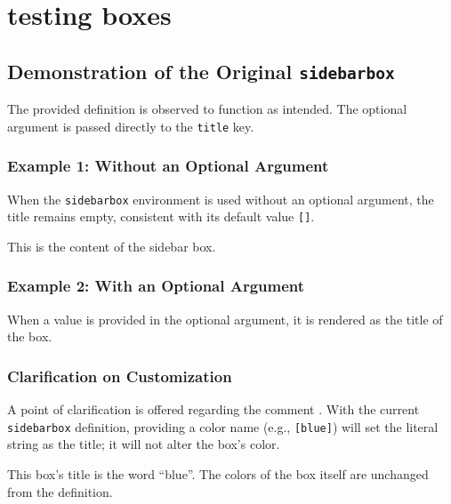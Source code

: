 \documentclass[12pt]{book}
\begin{document}
  \chapter{testing boxes}
  
\section*{Demonstration of the Original \texttt{sidebarbox}}

The provided definition is observed to function as intended. The optional argument is passed directly to the \texttt{title} key.

\subsection*{Example 1: Without an Optional Argument}
When the \texttt{sidebarbox} environment is used without an optional argument, the title remains empty, consistent with its default value \texttt{[]}.

\begin{sidebarbox}
  This is the content of the sidebar box. \lipsum[1][1-3]
\end{sidebarbox}


\subsection*{Example 2: With an Optional Argument}
When a value is provided in the optional argument, it is rendered as the title of the box.

\begin{sidebarbox}
  \lipsum[2][1-3]
\end{sidebarbox}

\subsection*{Clarification on Customization}
A point of clarification is offered regarding the comment 
. With the current 
\texttt{sidebarbox} definition, providing a color name 
(e.g., \texttt{[blue]}) will set the literal string 
as the title; it will not alter the box's color.

\begin{sidebarbox}[blue]
  This box's title is the word ``blue''. The colors of the box itself are unchanged from the definition.
\end{sidebarbox}
\end{document}
